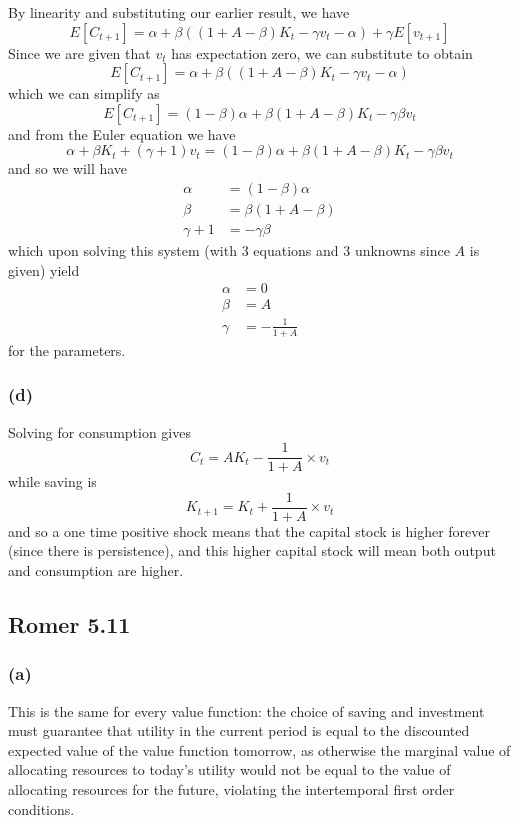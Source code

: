 \documentclass[11pt]{amsart}
\begin{document}
By linearity and substituting our earlier result, we have
\[
E[C_{t+1}] = \alpha + \beta ((1 + A - \beta) K_t - \gamma v_t - \alpha) + \gamma E[v_{t+1}]
\]
Since we are given that $v_t$ has expectation zero, we can substitute to obtain
\[
E[C_{t+1}] = \alpha + \beta ((1 + A - \beta) K_t - \gamma v_t - \alpha)
\]
which we can simplify as
\[
E[C_{t+1}] = (1 - \beta) \alpha + \beta (1 + A - \beta) K_t - \gamma \beta v_t
\]
and from the Euler equation we have
\[
\alpha + \beta K_t + (\gamma + 1) v_t  = (1 - \beta) \alpha + \beta (1 + A - \beta) K_t - \gamma \beta v_t
\]
and so we will have
\begin{align*}
\alpha &= (1 - \beta) \alpha \\
\beta &= \beta (1 + A - \beta) \\
\gamma + 1 &= -\gamma \beta
\end{align*}
which upon solving this system (with 3 equations and 3 unknowns since $A$ is given) yield
\begin{align*}
\alpha &= 0 \\
\beta &= A\\
\gamma &= -\frac{1}{1 + A}
\end{align*}
for the parameters.

\subsubsection*{(d)}

Solving for consumption gives
\[
C_t = AK_t - \frac{1}{1 + A} \times v_t
\]
while saving is
\[
K_{t+1} = K_t + \frac{1}{1 + A} \times v_t
\]
and so a one time positive shock means that the capital stock is higher forever (since there is persistence), and this higher capital stock will mean both output and consumption are higher.


\subsection{Romer 5.11}

\subsubsection*{(a)}

This is the same for every value function: the choice of saving and investment must guarantee that utility in the current period is equal to the discounted expected value of the value function tomorrow, as otherwise the marginal value of allocating resources to today's utility would not be equal to the value of allocating resources for the future, violating the intertemporal first order conditions.
\end{document}
